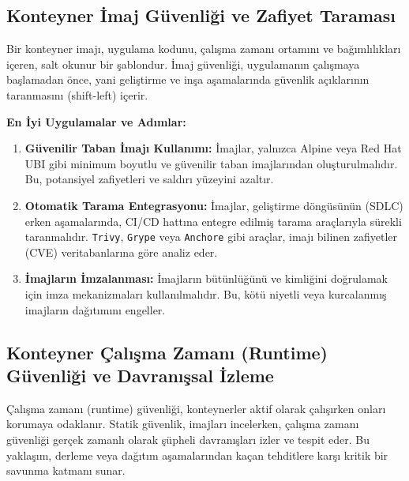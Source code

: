 \subsection{Konteyner İmaj Güvenliği ve Zafiyet Taraması}

Bir konteyner imajı, uygulama kodunu, çalışma zamanı ortamını ve bağımlılıkları içeren, salt okunur bir şablondur. İmaj güvenliği, uygulamanın çalışmaya başlamadan önce, yani geliştirme ve inşa aşamalarında güvenlik açıklarının taranmasını (shift-left) içerir.

\textbf{En İyi Uygulamalar ve Adımlar:}

\begin{enumerate}
    \item \textbf{Güvenilir Taban İmajı Kullanımı:} İmajlar, yalnızca Alpine veya Red Hat UBI gibi minimum boyutlu ve güvenilir taban imajlarından oluşturulmalıdır. Bu, potansiyel zafiyetleri ve saldırı yüzeyini azaltır.
    \item \textbf{Otomatik Tarama Entegrasyonu:} İmajlar, geliştirme döngüsünün (SDLC) erken aşamalarında, CI/CD hattına entegre edilmiş tarama araçlarıyla sürekli taranmalıdır. \texttt{Trivy}, \texttt{Grype} veya \texttt{Anchore} gibi araçlar, imajı bilinen zafiyetler (CVE) veritabanlarına göre analiz eder.
    \item \textbf{İmajların İmzalanması:} İmajların bütünlüğünü ve kimliğini doğrulamak için imza mekanizmaları kullanılmalıdır. Bu, kötü niyetli veya kurcalanmış imajların dağıtımını engeller.
\end{enumerate}

\subsection{Konteyner Çalışma Zamanı (Runtime) Güvenliği ve Davranışsal İzleme}

Çalışma zamanı (runtime) güvenliği, konteynerler aktif olarak çalışırken onları korumaya odaklanır. Statik güvenlik, imajları incelerken, çalışma zamanı güvenliği gerçek zamanlı olarak şüpheli davranışları izler ve tespit eder. Bu yaklaşım, derleme veya dağıtım aşamalarından kaçan tehditlere karşı kritik bir savunma katmanı sunar.

